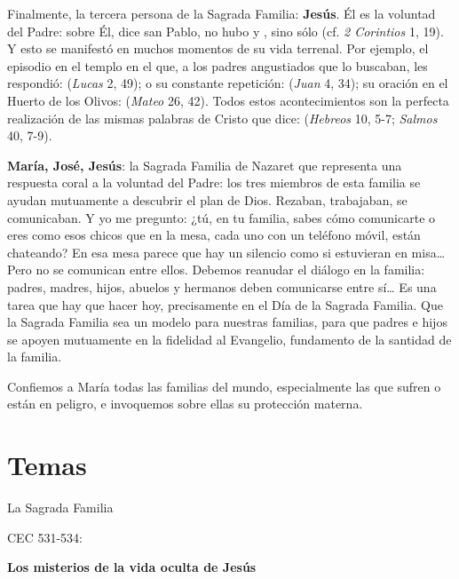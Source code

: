 Finalmente, la tercera persona de la Sagrada Familia: \textbf{Jesús}. Él es la voluntad del Padre: sobre Él, dice san Pablo, no hubo  y , sino sólo  (cf. \emph{2 Corintios} 1, 19). Y esto se manifestó en muchos momentos de su vida terrenal. Por ejemplo, el episodio en el templo en el que, a los padres angustiados que lo buscaban, les respondió:  (\emph{Lucas} 2, 49); o su constante repetición:  (\emph{Juan} 4, 34); su oración en el Huerto de los Olivos:  (\emph{Mateo} 26, 42). Todos estos acontecimientos son la perfecta realización de las mismas palabras de Cristo que dice:  (\emph{Hebreos} 10, 5-7; \emph{Salmos} 40, 7-9).

\textbf{María, José, Jesús}: la Sagrada Familia de Nazaret que representa una respuesta coral a la voluntad del Padre: los tres miembros de esta familia se ayudan mutuamente a descubrir el plan de Dios. Rezaban, trabajaban, se comunicaban. Y yo me pregunto: ¿tú, en tu familia, sabes cómo comunicarte o eres como esos chicos que en la mesa, cada uno con un teléfono móvil, están chateando? En esa mesa parece que hay un silencio como si estuvieran en misa\ldots{} Pero no se comunican entre ellos. Debemos reanudar el diálogo en la familia: padres, madres, hijos, abuelos y hermanos deben comunicarse entre sí\ldots{} Es una tarea que hay que hacer hoy, precisamente en el Día de la Sagrada Familia. Que la Sagrada Familia sea un modelo para nuestras familias, para que padres e hijos se apoyen mutuamente en la fidelidad al Evangelio, fundamento de la santidad de la familia.

Confiemos a María  todas las familias del mundo, especialmente las que sufren o están en peligro, e invoquemos sobre ellas su protección materna.


\section{Temas}

La Sagrada Familia

CEC 531-534:

\textbf{Los misterios de la vida oculta de Jesús}

